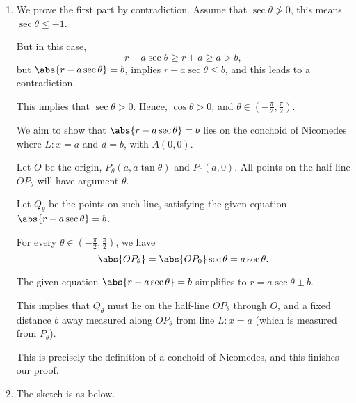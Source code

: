 \Question{\currfilebase}

\begin{enumerate}
    \item We prove the first part by contradiction. Assume that \(\sec\theta \ngtr 0\), this means \(\sec \theta \leq -1\).

          But in this case,
          \[
              r - a \sec \theta \geq r + a \geq a > b,
          \]
          but \(\abs{r - a \sec \theta} = b\), implies \(r - a \sec \theta \leq b\), and this leads to a contradiction.

          This implies that \(\sec \theta > 0\). Hence, \(\cos \theta > 0\), and \(\theta \in \left(-\frac{\pi}{2}, \frac{\pi}{2}\right)\).

          We aim to show that \(\abs{r - a \sec \theta} = b\) lies on the conchoid of Nicomedes where \(L: x = a\) and \(d = b\), with \(A(0, 0)\).

          Let \(O\) be the origin, \(P_{\theta}(a, a \tan \theta)\) and \(P_0(a, 0)\). All points on the half-line \(OP_{\theta}\) will have argument \(\theta\).

          \begin{center}
              
          \end{center}

          Let \(Q_{\theta}\) be the points on such line, satisfying the given equation \(\abs{r - a \sec \theta} = b\).

          For every \(\theta \in \left(-\frac{\pi}{2}, \frac{\pi}{2}\right)\), we have
          \[
              \abs{OP_{\theta}} = \abs{OP_0} \sec \theta = a \sec \theta.
          \]

          The given equation \(\abs{r - a \sec \theta} = b\) simplifies to \(r = a \sec \theta \pm b\).

          This implies that \(Q_{\theta}\) must lie on the half-line \(OP_{\theta}\) through \(O\), and a fixed distance \(b\) away measured along \(OP_{\theta}\) from line \(L: x = a\) (which is measured from \(P_{\theta}\)).

          This is precisely the definition of a conchoid of Nicomedes, and this finishes our proof.

          \begin{center}
              
          \end{center}

    \item The sketch is as below.


\end{enumerate}
